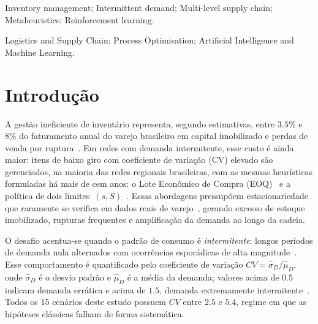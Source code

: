 \documentclass[a4paper,11pt]{article}
\begin{document}
\bigskip
\begin{keywords}
Inventory management; Intermittent demand; Multi-level supply chain;
Metaheuristics; Reinforcement learning.

\bigskip
{}
Logistics and Supply Chain; Process Optimisation;
Artificial Intelligence and Machine Learning.
\end{keywords}

\section{Introdução}

A gestão ineficiente de inventário representa, segundo estimativas,
entre \(3.5\%\) e \(8\%\) do faturamento anual do varejo brasileiro em
capital imobilizado e perdas de venda por ruptura~\citep{silver:2017}.
Em redes com demanda intermitente, esse custo é ainda maior: itens
de baixo giro com coeficiente de variação (CV) elevado são
gerenciados, na maioria das redes regionais brasileiras, com as
mesmas heurísticas formuladas há mais de cem anos: o Lote Econômico
de Compra (EOQ)~\citep{harris:1913} e a política de dois
limites~$(s,S)$~\citep{hadley:1963}. Essas abordagens pressupõem
estacionariedade que raramente se verifica em dados reais de
varejo~\citep{silver:2017}, gerando excesso de estoque imobilizado,
rupturas frequentes e amplificação da demanda ao longo da cadeia.

O desafio acentua-se quando o padrão de consumo é
\emph{intermitente}: longos períodos de demanda nula alternados com
ocorrências esporádicas de alta magnitude~\citep{croston:1972}.
Esse comportamento é quantificado pelo coeficiente de variação
$CV = \hat{\sigma}_D / \hat{\mu}_D$, onde $\hat{\sigma}_D$ é o
desvio padrão e $\hat{\mu}_D$ é a média da demanda; valores acima de \(0.5\)
indicam demanda errática e acima de \(1.5\), demanda extremamente
intermitente~\citep{syntetos:2001}. Todos os 15 cenários deste
estudo possuem $CV$ entre \(2.5\) e \(5.4\), regime em que as hipóteses
clássicas falham de forma sistemática.

\end{document}
